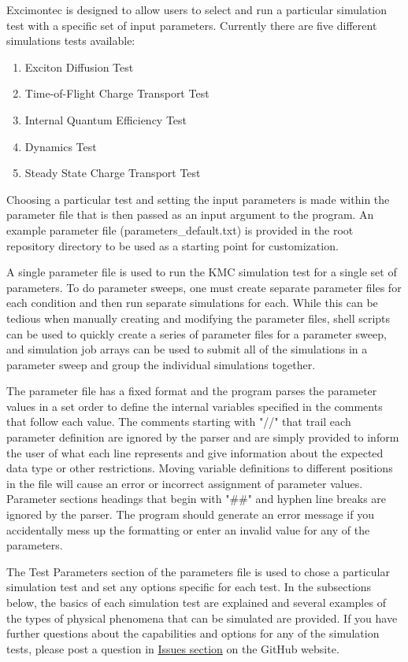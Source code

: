 \documentclass[%
 reprint,onecolumn,notitlepage,
superscriptaddress,longbibliography,
 amsmath,amssymb,
 aps,rmp,floatfix,
]{revtex4-1}
\begin{document}
Excimontec is designed to allow users to select and run a particular simulation test with a specific set of input parameters.
Currently there are five different simulations tests available:
\begin{enumerate}
    \item Exciton Diffusion Test
    \item Time-of-Flight Charge Transport Test
    \item Internal Quantum Efficiency Test
    \item Dynamics Test
    \item Steady State Charge Transport Test
\end{enumerate}
Choosing a particular test and setting the input parameters is made within the parameter file that is then passed as an input argument to the program.
An example parameter file (parameters\_default.txt) is provided in the root repository directory to be used as a starting point for customization.

A single parameter file is used to run the KMC simulation test for a single set of parameters.
To do parameter sweeps, one must create separate parameter files for each condition and then run separate simulations for each.
While this can be tedious when manually creating and modifying the parameter files, shell scripts can be used to quickly create a series of parameter files for a parameter sweep, and simulation job arrays can be used to submit all of the simulations in a parameter sweep and group the individual simulations together.

The parameter file has a fixed format and the program parses the parameter values in a set order to define the internal variables specified in the comments that follow each value.
The comments starting with "//" that trail each parameter definition are ignored by the parser and are simply provided to inform the user of what each line represents and give information about the expected data type or other restrictions.
Moving variable definitions to different positions in the file will cause an error or incorrect assignment of parameter values.
Parameter sections headings that begin with "\#\#" and hyphen line breaks are ignored by the parser. 
The program should generate an error message if you accidentally mess up the formatting or enter an invalid value for any of the parameters.

The Test Parameters section of the parameters file is used to chose a particular simulation test and set any options specific for each test. In the subsections below, the basics of each simulation test are explained and several examples of the types of physical phenomena that can be simulated are provided.
If you have further questions about the capabilities and options for any of the simulation tests, please post a question in \href{https://github.com/MikeHeiber/Excimontec/issues}{Issues section} on the GitHub website.
\end{document}
